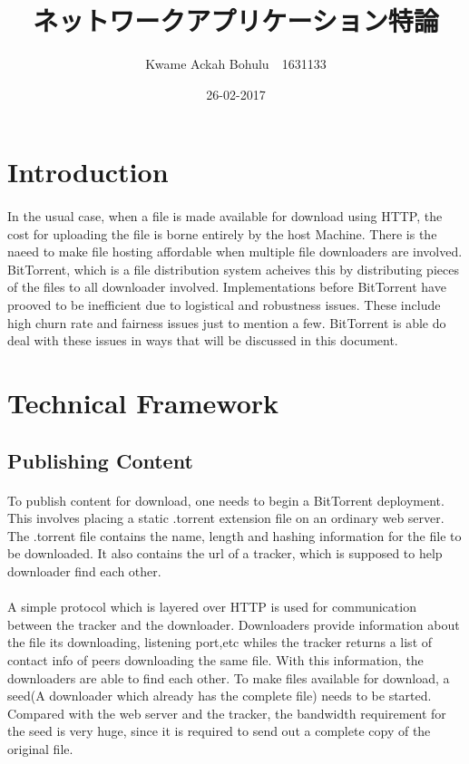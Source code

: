 \documentclass[24 pts]{article}
\title{ネットワークアプリケーション特論 }
\date{26-02-2017}
\author{Kwame Ackah Bohulu　1631133}
\begin{document}
\maketitle
\newpage
\section{Introduction}\paragraph{}
In the usual case, when a file is made available for download using HTTP, the cost for uploading the file is borne entirely by the host Machine. There is the naeed to make file hosting affordable when multiple file downloaders are involved. BitTorrent, which is a file distribution system acheives this by distributing pieces of the files to all downloader involved. Implementations before BitTorrent have prooved to be inefficient due to logistical and robustness issues. These include high churn rate and fairness issues just to mention a few. BitTorrent is able do deal with these issues in ways that will be discussed in this document.
\section{Technical Framework}

\subsection{Publishing Content}\paragraph{}
To publish content for download, one needs to begin a BitTorrent deployment. This involves placing a static .torrent extension file on an ordinary web server. The .torrent file contains the name, length and hashing information for the file to be downloaded. It also contains the url of a tracker, which is supposed to help downloader find each other. \paragraph{}A simple protocol which is layered over HTTP is used for communication between the tracker and the downloader. Downloaders provide information about the file its downloading, listening port,etc whiles the tracker returns a list of contact info of peers downloading the same file. With this information, the downloaders are able to find each other. To make files available for download, a seed(A downloader which already has the complete file) needs to be started. Compared with the web server and the tracker, the bandwidth requirement for the seed is very huge, since it is required to send out a complete copy of the original file.
\end{document}
